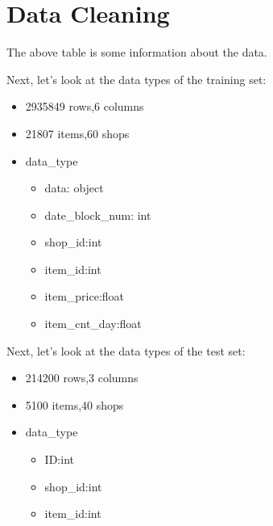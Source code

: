 \documentclass{amsart}
\begin{document}
\section{Data Cleaning}
\begin{table}[h]
    \begin{center}
    \end{center}
    \caption{Data Infomation}
  \end{table}
  The above table is some information about the data.\par
  Next, let's look at the data types of the training set:
  \begin{itemize}
    \item 2935849 rows,6 columns
    \item 21807 items,60 shops
    \item data_type
          \begin{itemize}
            \item data: object
            \item date_block_num: int
            \item shop_id:int
            \item item_id:int
            \item item_price:float
            \item item_cnt_day:float
          \end{itemize}
  \end{itemize}
  Next, let's look at the data types of the test set:
  \begin{itemize}
    \item 214200 rows,3 columns
    \item 5100 items,40 shops
    \item data_type
          \begin{itemize}
            \item ID:int
            \item shop_id:int
            \item item_id:int
          \end{itemize}
  \end{itemize}
\end{document}
